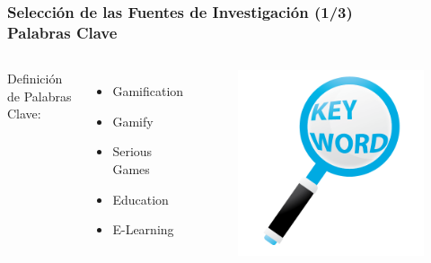 \documentclass{beamer}
\begin{document}
\begin{frame}
	\frametitle{Selección de las Fuentes de Investigación (1/3)\\Palabras Clave}
	\begin{columns}[c] %
		Definición de Palabras Clave:
		\begin{itemize}
			\item Gamification
			\item Gamify
			\item Serious Games
			\item Education
			\item E-Learning
		\end{itemize}
		\begin{figure}
			\begin{center}
				\includegraphics[scale=0.2]{images/2icons/keyword.png}
			\end{center}
		\end{figure}	    	
	\end{columns}
\end{frame}
\end{document}
